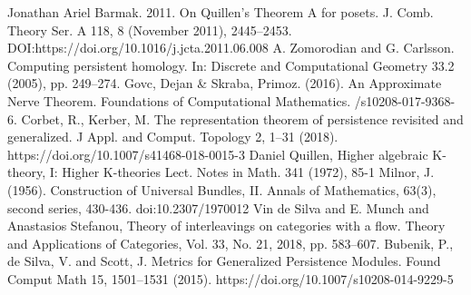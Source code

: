 \begin{enumerate}
  Jonathan Ariel Barmak. 2011.
  \newblock On Quillen’s Theorem A for posets.
  \newblock J. Comb. Theory Ser. A 118, 8 (November 2011), 2445–2453.
  \newblock DOI:https://doi.org/10.1016/j.jcta.2011.06.008
  A. Zomorodian and G. Carlsson.
  \newblock Computing persistent homology.
  \newblock In: Discrete and Computational Geometry 33.2 (2005), pp. 249–274.
  Govc, Dejan \& Skraba, Primoz. (2016).
  \newblock An Approximate Nerve Theorem.
  \newblock Foundations of Computational Mathematics.
  /s10208-017-9368-6.
  Corbet, R., Kerber, M.
  \newblock The representation theorem of persistence revisited and generalized.
  \newblock J Appl. and Comput. Topology 2, 1–31 (2018).
  \newblock https://doi.org/10.1007/s41468-018-0015-3
  Daniel Quillen,
  \newblock Higher algebraic K-theory, I: Higher K-theories Lect.
  \newblock Notes in Math. 341 (1972), 85-1
  Milnor, J. (1956).
  \newblock Construction of Universal Bundles, II.
  \newblock Annals of Mathematics, 63(3), second series, 430-436.
  \newblock doi:10.2307/1970012
  Vin de Silva and E. Munch and Anastasios Stefanou,
  \newblock Theory of interleavings on categories with a flow.
  \newblock Theory and Applications of Categories, Vol. 33, No. 21, 2018, pp. 583–607.
  Bubenik, P., de Silva, V. and Scott,
  \newblock J. Metrics for Generalized Persistence Modules.
  \newblock Found Comput Math 15, 1501–1531 (2015).
  \newblock https://doi.org/10.1007/s10208-014-9229-5
\end{enumerate}
